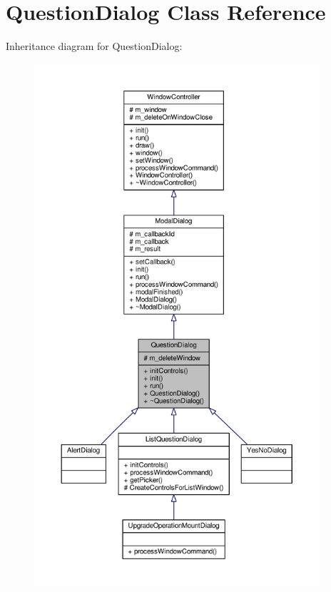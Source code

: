 \hypertarget{classQuestionDialog}{}\section{Question\+Dialog Class Reference}
\label{classQuestionDialog}


Inheritance diagram for Question\+Dialog\+:
\nopagebreak
\begin{figure}[H]
\begin{center}
\leavevmode
\includegraphics[height=550pt]{df/d23/classQuestionDialog__inherit__graph}
\end{center}
\end{figure}


